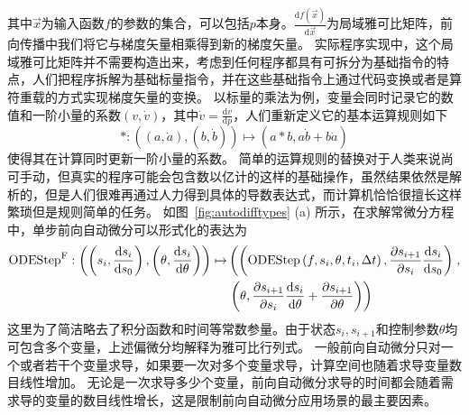 \documentclass[A4,twoside,fontset=ubuntu,UTF8]{ctexart}
\def\D{\mathrm{d}}
\begin{document}
其中$\vec x$为输入函数$f$的参数的集合，可以包括$p$本身。$\frac{\D f(\vec x)}{\D \vec x}$为局域雅可比矩阵，前向传播中我们将它与梯度矢量相乘得到新的梯度矢量。
实际程序实现中，这个局域雅可比矩阵并不需要构造出来，考虑到任何程序都具有可拆分为基础指令的特点，人们把程序拆解为基础标量指令，并在这些基础指令上通过代码变换或者是算符重载的方式实现梯度矢量的变换。
以标量的乘法为例，变量会同时记录它的数值和一阶小量的系数$(v, \dot v)$，其中$\dot v = \frac{\D v}{\D p}$，人们重新定义它的基本运算规则如下
$$\texttt{*}: ((a, \dot a), (b, \dot b)) \mapsto (a * b, a \dot b + b \dot a)$$
使得其在计算同时更新一阶小量的系数。
简单的运算规则的替换对于人类来说尚可手动，但真实的程序可能会包含数以亿计的这样的基础操作，虽然结果依然是解析的，但是人们很难再通过人力得到具体的导数表达式，而计算机恰恰很擅长这样繁琐但是规则简单的任务。
如图~\ref{fig:autodifftypes} (a) 所示，在求解常微分方程中，单步前向自动微分可以形式化的表达为
\begin{align*}
    {\rm ODEStep}^{\rm F} : \left(\left(s_{i}, \frac{\D s_{i}}{\D s_0}\right), \left(\theta, \frac{\D s_{i}}{\D \theta}\right)\right)
        \mapsto &\left(\left({\rm ODEStep}\left(f, s_{i}, \theta, t_i, \Delta t \right), \frac{\partial s_{i+1}}{\partial s_i} \frac{\D s_{i}}{\D s_0}\right)\right., \\
        &\left.\left(\theta, \frac{\partial s_{i+1}}{\partial s_i} \frac{\D s_{i}}{\D \theta} + \frac{\partial s_{i+1}}{\partial \theta}\right)\right)
\end{align*}
这里为了简洁略去了积分函数和时间等常数参量。由于状态$s_i, s_{i+1}$和控制参数$\theta$均可包含多个变量，上述偏微分均解释为雅可比行列式。
一般前向自动微分只对一个或者若干个变量求导，如果要一次对多个变量求导，计算空间也随着求导变量数目线性增加。
无论是一次求导多少个变量，前向自动微分求导的时间都会随着需求导的变量的数目线性增长，这是限制前向自动微分应用场景的最主要因素。
\end{document}
